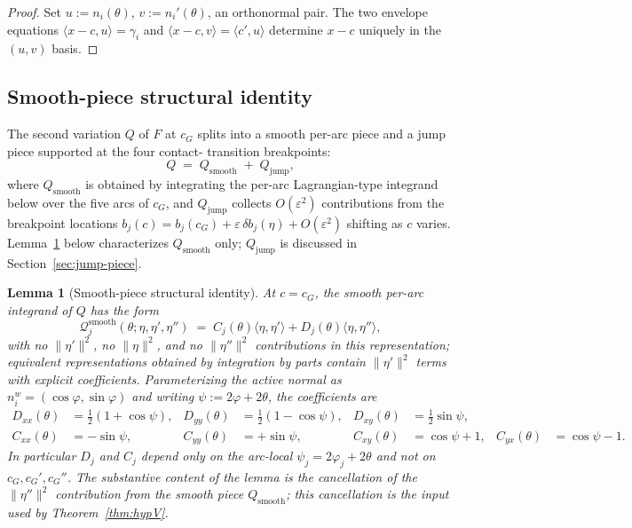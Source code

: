 \documentclass[11pt]{amsart}
\theoremstyle{plain}
\newtheorem{lemma}[theorem]{Lemma}
\theoremstyle{definition}
\newcommand{\cG}{c_{G}}
\begin{document}
\begin{proof}
Set $u := n_{i}(\theta)$, $v := n_{i}'(\theta)$, an orthonormal pair.
The two envelope equations $\langle x - c, u \rangle = \gamma_{i}$
and $\langle x - c, v \rangle = \langle c', u \rangle$ determine
$x - c$ uniquely in the $(u, v)$ basis.
\end{proof}

\subsection{Smooth-piece structural identity}

The second variation $Q$ of $F$ at $\cG$ splits into a smooth
per-arc piece and a jump piece supported at the four contact-
transition breakpoints:
\begin{equation}\label{eq:Q-split}
   Q \;=\; Q_{\mathrm{smooth}} \;+\; Q_{\mathrm{jump}},
\end{equation}
where $Q_{\mathrm{smooth}}$ is obtained by integrating the
per-arc Lagrangian-type integrand below over the five arcs of
$\cG$, and $Q_{\mathrm{jump}}$ collects $O(\varepsilon^{2})$
contributions from the breakpoint locations $b_{j}(c) = b_{j}(\cG)
+ \varepsilon\,\delta b_{j}(\eta) + O(\varepsilon^{2})$ shifting as
$c$ varies.  Lemma~\ref{lem:second-variation-structure} below
characterizes $Q_{\mathrm{smooth}}$ only; $Q_{\mathrm{jump}}$ is
discussed in Section~\ref{sec:jump-piece}.

\begin{lemma}[Smooth-piece structural identity]\label{lem:second-variation-structure}
At $c = \cG$, the smooth per-arc integrand of $Q$ has the form
\begin{equation}\label{eq:Q-decomp-final}
   \mathcal{Q}_{j}^{\mathrm{smooth}}(\theta; \eta, \eta', \eta'') \;=\;
   C_{j}(\theta) \langle \eta, \eta' \rangle +
   D_{j}(\theta) \langle \eta, \eta'' \rangle ,
\end{equation}
with no $\|\eta'\|^{2}$, no $\|\eta\|^{2}$, and no $\|\eta''\|^{2}$
contributions \emph{in this representation}; equivalent
representations obtained by integration by parts contain
$\|\eta'\|^{2}$ terms with explicit coefficients.  Parameterizing the active normal as $n_{i}^{w} =
(\cos\varphi, \sin\varphi)$ and writing $\psi := 2\varphi + 2\theta$,
the coefficients are
\begin{align}
   D_{xx}(\theta) &= \tfrac{1}{2}(1 + \cos\psi), &
   D_{yy}(\theta) &= \tfrac{1}{2}(1 - \cos\psi), &
   D_{xy}(\theta) &= \tfrac{1}{2}\sin\psi, \\
   C_{xx}(\theta) &= -\sin\psi, &
   C_{yy}(\theta) &= +\sin\psi, &
   C_{xy}(\theta) &= \cos\psi + 1, & C_{yx}(\theta) &= \cos\psi - 1.
\end{align}
In particular $D_{j}$ and $C_{j}$ depend only on the arc-local
$\psi_{j} = 2\varphi_{j} + 2\theta$ and not on $\cG, \cG', \cG''$.
The substantive content of the lemma is the cancellation of the
$\|\eta''\|^{2}$ contribution from the smooth piece $Q_{\mathrm{smooth}}$;
this cancellation is the input used by Theorem~\ref{thm:hypV}.
\end{lemma}
\end{document}
